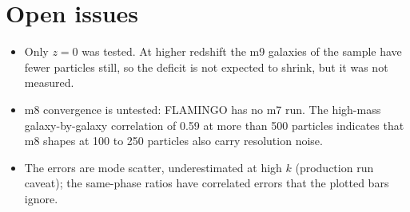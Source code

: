 \documentclass[11pt]{article}
\begin{document}
\section{Open issues}
\label{app:open}

\begin{itemize}
  \item Only $z = 0$ was tested. At higher redshift the m9 galaxies of the
    sample have fewer particles still, so the deficit is not expected to shrink,
    but it was not measured.
  \item m8 convergence is untested: FLAMINGO has no m7 run. The high-mass
    galaxy-by-galaxy correlation of 0.59 at more than 500 particles indicates
    that m8 shapes at 100 to 250 particles also carry resolution noise.
  \item The errors are mode scatter, underestimated at high $k$ (production
    run caveat); the same-phase ratios have correlated errors that the plotted
    bars ignore.
\end{itemize}
\end{document}

